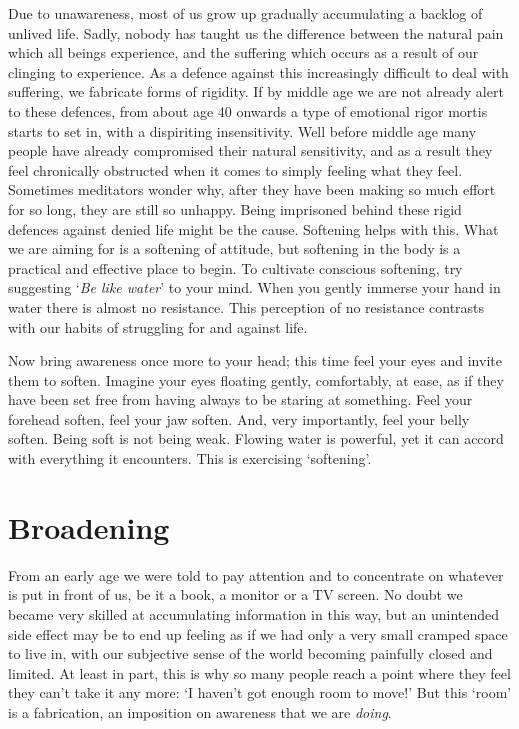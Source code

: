 Due to unawareness, most of us grow up gradually accumulating a
backlog of unlived life. Sadly, nobody has taught us the difference
between the natural pain which all beings experience, and the suffering
which occurs as a result of our clinging to experience. As a defence
against this increasingly difficult to deal with suffering, we fabricate
forms of rigidity. If by middle age we are not already alert to these
defences, from about age 40 onwards a type of emotional rigor mortis
starts to set in, with a dispiriting insensitivity. Well before middle
age many people have already compromised their natural sensitivity, and
as a result they feel chronically obstructed when it comes to simply
feeling what they feel. Sometimes meditators wonder why, after they have
been making so much effort for so long, they are still so unhappy. Being
imprisoned behind these rigid defences against denied life might be the
cause. Softening helps with this. What we are aiming for is a softening
of attitude, but softening in the body is a practical and effective
place to begin. To cultivate conscious softening, try suggesting ‘\emph{Be
like water}’ to your mind. When you gently immerse your hand in water
there is almost no resistance. This perception of no resistance
contrasts with our habits of struggling for and against life.

Now bring awareness once more to your head; this time feel your eyes and
invite them to soften. Imagine your eyes floating gently, comfortably,
at ease, as if they have been set free from having always to be staring
at something. Feel your forehead soften, feel your jaw soften. And, very
importantly, feel your belly soften. Being soft is not being weak.
Flowing water is powerful, yet it can accord with everything it
encounters. This is exercising ‘softening’.

\section{Broadening}

From an early age we were told to pay attention and to concentrate on
whatever is put in front of us, be it a book, a monitor or a TV screen.
No doubt we became very skilled at accumulating information in this way,
but an unintended side effect may be to end up feeling as if we had only
a very small cramped space to live in, with our subjective sense of the
world becoming painfully closed and limited. At least in part, this is
why so many people reach a point where they feel they can’t take it any
more: ‘I haven’t got enough room to move!’ But this ‘room’ is a
fabrication, an imposition on awareness that we are \emph{doing}.

